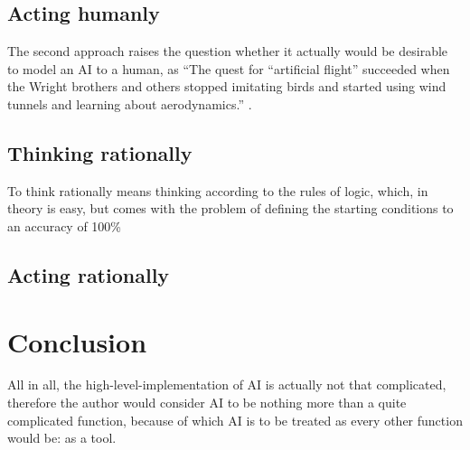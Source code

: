 \subsection{Acting humanly}
The second approach raises the question whether it actually would be desirable
to model an AI to a human, as “The quest for “artificial flight” succeeded when the Wright brothers and others stopped imitating birds and started using wind tunnels and learning about aerodynamics.” \cite[page 3]{russellArtificialIntelligenceModern2010}. 
\subsection{Thinking rationally}
To think rationally means thinking according to the rules of logic, which, in theory is easy, but comes with the problem of defining the starting conditions to an accuracy of 100\% 
\subsection{Acting rationally}
\section{Conclusion}
All in all, the high-level-implementation of AI is actually not that complicated, therefore the author would consider AI to be nothing more than a quite complicated function, because of which AI is to be treated as every other function would be: as a tool. 